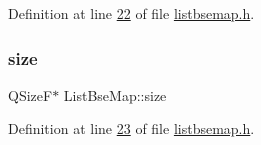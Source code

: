 Definition at line \hyperlink{a00065_source_l00022}{22} of file \hyperlink{a00065_source}{listbsemap.\+h}.

\mbox{\label{a00169_abbb51f80961cecea1bec63612c5b0fd1}} 
\subsubsection{\texorpdfstring{size}{size}}
{\footnotesize\ttfamily Q\+SizeF$\ast$ List\+Bse\+Map\+::size\hspace{0.3cm}{\ttfamily [protected]}}



Definition at line \hyperlink{a00065_source_l00023}{23} of file \hyperlink{a00065_source}{listbsemap.\+h}.

